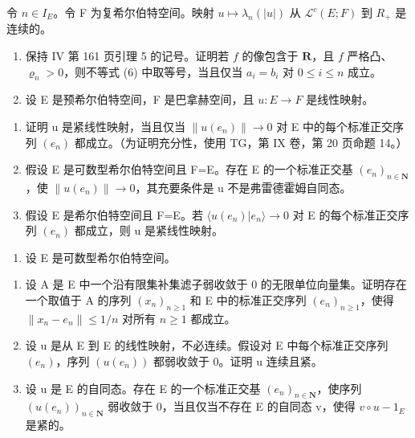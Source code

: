 令 \(n \in I_{E}\)。令 F 为复希尔伯特空间。映射 \(u \mapsto \lambda_{n}(|u|)\) 从 \(\mathcal{L}^{c}(E;F)\) 到 \(R_{+}\) 是连续的。

\begin{enumerate}
\def\labelenumi{\arabic{enumi})}
\setcounter{enumi}{18}
\item
  保持 IV 第 161 页引理 5 的记号。证明若 \(f\) 的像包含于 \(\mathbf{R}\)，且 \(f\) 严格凸、\(\varrho_n > 0\)，则不等式 (6) 中取等号，当且仅当 \(a_i = b_i\) 对 \(0 \leqslant i \leqslant n\) 成立。
\item
  设 E 是预希尔伯特空间，F 是巴拿赫空间，且 \(u: E \to F\) 是线性映射。
\end{enumerate}

\begin{enumerate}
\def\labelenumi{\alph{enumi})}
\item
  证明 u 是紧线性映射，当且仅当 \(\|u(e_{n})\|\to0\) 对 E 中的每个标准正交序列 \((e_{n})\) 都成立。（为证明充分性，使用 TG，第 IX 卷，第 20 页命题 14。）
\item
  假设 E 是可数型希尔伯特空间且 F=E。存在 E 的一个标准正交基 \((e_{n})_{n\in\mathbf{N}}\)，使 \(\|u(e_{n})\|\to0\)，其充要条件是 u 不是弗雷德霍姆自同态。
\item
  假设 E 是希尔伯特空间且 F=E。若 \(\langle u(e_{n}) | e_{n} \rangle \to 0\) 对 E 的每个标准正交序列 \((e_{n})\) 都成立，则 u 是紧线性映射。
\end{enumerate}

\begin{enumerate}
\def\labelenumi{\arabic{enumi})}
\setcounter{enumi}{20}
\tightlist
\item
  设 E 是可数型希尔伯特空间。
\end{enumerate}

\begin{enumerate}
\def\labelenumi{\alph{enumi})}
\item
  设 A 是 E 中一个沿有限集补集滤子弱收敛于 0 的无限单位向量集。证明存在一个取值于 A 的序列 \((x_{n})_{n\geqslant1}\) 和 E 中的标准正交序列 \((e_{n})_{n\geqslant1}\)，使得 \(\|x_{n}-e_{n}\|\leqslant1/n\) 对所有 \(n\geqslant1\) 都成立。
\item
  设 u 是从 E 到 E 的线性映射，不必连续。假设对 E 中每个标准正交序列 \((e_{n})\)，序列 \((u(e_{n}))\) 都弱收敛于 0。证明 u 连续且紧。
\item
  设 u 是 E 的自同态。存在 E 的一个标准正交基 \((e_{n})_{n\in\mathbf{N}}\)，使序列 \((u(e_{n}))_{n\in\mathbf{N}}\) 弱收敛于 0，当且仅当不存在 E 的自同态 v，使得 \(v\circ u-1_{E}\) 是紧的。
\end{enumerate}

